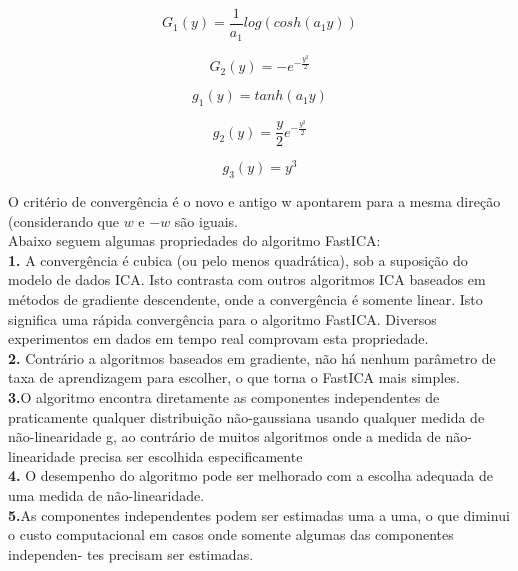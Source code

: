 \documentclass[a4paper, 12pt]{article}
\begin{document}
\begin{equation}\label{eq1}
G_1(y) = \frac{1}{a_1}log(cosh(a_1y))
\end{equation}

\begin{equation}\label{eq2}
G_2(y) = -e^{-\frac{y^2}{2} }
\end{equation}

\begin{equation}\label{eq3}
g_1(y) = tanh(a_1y)
\end{equation}

\begin{equation}\label{eq4}
g_2(y)= \frac{y}{2}e^{-\frac{y^2}{2}}
\end{equation}

\begin{equation}\label{kurtis}
g_3(y) = y^3
\end{equation}


O critério de convergência é o novo e antigo w apontarem para a mesma direção
(considerando que $w$ e $-w$ são iguais.\\
Abaixo seguem algumas propriedades do algoritmo FastICA:\\

\textbf{1.} A convergência é cubica (ou pelo menos quadrática), sob a suposição do modelo de
dados ICA. Isto contrasta com outros algoritmos ICA baseados em métodos de
gradiente descendente, onde a convergência é somente linear. Isto significa uma
rápida convergência para o algoritmo FastICA. Diversos experimentos em dados em
tempo real comprovam esta propriedade.\\

\textbf{2.} Contrário a algoritmos baseados em gradiente, não há nenhum parâmetro de taxa de
aprendizagem para escolher, o que torna o FastICA mais simples.\\

\textbf{3.}O algoritmo encontra diretamente as componentes independentes de praticamente
qualquer distribuição não-gaussiana usando qualquer medida de não-linearidade g,
ao contrário de muitos algoritmos onde a medida de não-linearidade precisa ser
escolhida especificamente\\

\textbf{4.} O desempenho do algoritmo pode ser melhorado com a escolha adequada de uma
medida de não-linearidade.\\

\textbf{5.}As componentes independentes podem ser estimadas uma a uma, o que diminui o
custo computacional em casos onde somente algumas das componentes independen-
tes precisam ser estimadas.\\
\end{document}
